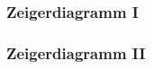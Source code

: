 \documentclass[8pt, aspectratio=43]{beamer}
\begin{document}
	
		

\begin{frame}\frametitle{Zeigerdiagramm I}

%		

\end{frame}


\begin{frame}\frametitle{Zeigerdiagramm II}



%	


\end{frame}

\end{document}
